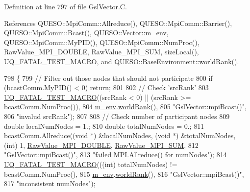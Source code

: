 Definition at line 797 of file Gsl\-Vector.\-C.



References Q\-U\-E\-S\-O\-::\-Mpi\-Comm\-::\-Allreduce(), Q\-U\-E\-S\-O\-::\-Mpi\-Comm\-::\-Barrier(), Q\-U\-E\-S\-O\-::\-Mpi\-Comm\-::\-Bcast(), Q\-U\-E\-S\-O\-::\-Vector\-::m\-\_\-env, Q\-U\-E\-S\-O\-::\-Mpi\-Comm\-::\-My\-P\-I\-D(), Q\-U\-E\-S\-O\-::\-Mpi\-Comm\-::\-Num\-Proc(), Raw\-Value\-\_\-\-M\-P\-I\-\_\-\-D\-O\-U\-B\-L\-E, Raw\-Value\-\_\-\-M\-P\-I\-\_\-\-S\-U\-M, size\-Local(), U\-Q\-\_\-\-F\-A\-T\-A\-L\-\_\-\-T\-E\-S\-T\-\_\-\-M\-A\-C\-R\-O, and Q\-U\-E\-S\-O\-::\-Base\-Environment\-::world\-Rank().


\begin{DoxyCode}
798 \{
799   \textcolor{comment}{// Filter out those nodes that should not participate}
800   \textcolor{keywordflow}{if} (bcastComm.MyPID() < 0) \textcolor{keywordflow}{return};
801 
802   \textcolor{comment}{// Check 'srcRank'}
803   \hyperlink{_defines_8h_a56d63d18d0a6d45757de47fcc06f574d}{UQ\_FATAL\_TEST\_MACRO}((srcRank < 0) || (srcRank >= bcastComm.NumProc()),
804                       \hyperlink{class_q_u_e_s_o_1_1_vector_ae7615172bb1e54339151d3f3d71a0344}{m\_env}.\hyperlink{class_q_u_e_s_o_1_1_base_environment_a78b57112bbd0e6dd0e8afec00b40ffa7}{worldRank}(),
805                       \textcolor{stringliteral}{"GslVector::mpiBcast()"},
806                       \textcolor{stringliteral}{"invalud srcRank"});
807 
808   \textcolor{comment}{// Check number of participant nodes}
809   \textcolor{keywordtype}{double} localNumNodes = 1.;
810   \textcolor{keywordtype}{double} totalNumNodes = 0.;
811   bcastComm.Allreduce((\textcolor{keywordtype}{void} *) &localNumNodes, (\textcolor{keywordtype}{void} *) &totalNumNodes, (\textcolor{keywordtype}{int}) 1, 
      \hyperlink{_mpi_comm_8h_ad0f503bd9fecfe4e570ca3d15aaf2518}{RawValue\_MPI\_DOUBLE}, \hyperlink{_mpi_comm_8h_afbf78d291c032aa7f512bc566cee2bd1}{RawValue\_MPI\_SUM},
812                       \textcolor{stringliteral}{"GslVector::mpiBcast()"},
813                       \textcolor{stringliteral}{"failed MPI.Allreduce() for numNodes"});
814   \hyperlink{_defines_8h_a56d63d18d0a6d45757de47fcc06f574d}{UQ\_FATAL\_TEST\_MACRO}(((\textcolor{keywordtype}{int}) totalNumNodes) != bcastComm.NumProc(),
815                       \hyperlink{class_q_u_e_s_o_1_1_vector_ae7615172bb1e54339151d3f3d71a0344}{m\_env}.\hyperlink{class_q_u_e_s_o_1_1_base_environment_a78b57112bbd0e6dd0e8afec00b40ffa7}{worldRank}(),
816                       \textcolor{stringliteral}{"GslVector::mpiBcast()"},
817                       \textcolor{stringliteral}{"inconsistent numNodes"});

\end{DoxyCode}
